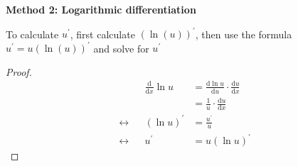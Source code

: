 \begin{enumerate}
        \textbf{Method 2: Logarithmic differentiation}

        To calculate $u^\prime$, first calculate $(\ln(u))^\prime$, then use the formula $u^\prime=u(\ln(u))^\prime$ and solve for $u^\prime$
        \begin{proof}
            \begin{align*}
                && \frac{\mathrm{d}}{\mathrm{d}x}\ln u & =\frac{\mathrm{d}\ln u}{\mathrm{d}u}\cdot\frac{\mathrm{d}u}{\mathrm{d}x} \\
                && & =\frac{1}{u}\cdot\frac{\mathrm{d}u}{\mathrm{d}x} \\
                \leftrightarrow && (\ln u)^\prime & =\frac{u^\prime}{u} \\
                \leftrightarrow && u^\prime & =u(\ln u)^\prime
            \end{align*}
        \end{proof}
\end{enumerate}

